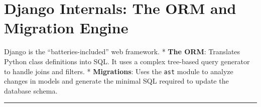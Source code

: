 \hypertarget{django-internals-the-orm-and-migration-engine}{%
\chapter{Django Internals: The ORM and Migration
Engine}\label{django-internals-the-orm-and-migration-engine}}

Django is the ``batteries-included'' web framework. * \textbf{The ORM}:
Translates Python class definitions into SQL. It uses a complex
tree-based query generator to handle joins and filters. *
\textbf{Migrations}: Uses the \passthrough{\lstinline!ast!} module to
analyze changes in models and generate the minimal SQL required to
update the database schema.

\begin{center}\rule{0.5\linewidth}{0.5pt}\end{center}
